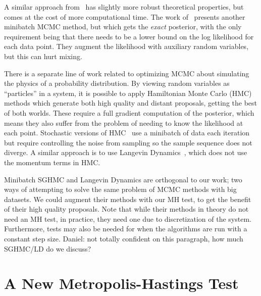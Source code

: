 \documentclass{article}
\begin{document}
A similar approach from~\cite{icml2014c1_bardenet14} has slightly more robust theoretical
properties, but comes at the cost of more computational time. The work
of~\cite{conf/uai/MaclaurinA14} presents another minibatch MCMC method, but which gets the
\emph{exact} posterior, with the only requirement being that there needs to be a lower bound on the
log likelihood for each data point. They augment the likelihood with auxiliary random variables, but
this can hurt mixing.

There is a separate line of work related to optimizing MCMC about simulating the physics of a
probability distribution. By viewing random variables as ``particles'' in a system, it is possible
to apply Hamiltonian Monte Carlo (HMC)~\cite{mcmc_hamiltonian_2010} methods which generate both high
quality and distant proposals, getting the best of both worlds. These require a full gradient
computation of the posterior, which means they also suffer from the problem of needing to know the
likelihood at each point. Stochastic versions of HMC~\cite{sghmc_2014,stochastic_thermostats_2014}
use a minibatch of data each iteration but require controlling the noise from sampling so the sample
sequence does not diverge. A similar approach is to use Langevin
Dynamics~\cite{langevin_2011,conf/icml/AhnBW12}, which does not use the momentum terms in HMC.

Minibatch SGHMC and Langevin Dynamics are orthogonal to our work; two ways of attempting
to solve the same problem of MCMC methods with big datasets. We could augment their methods with our
MH test, to get the benefit of their high quality proposals. Note that while their methods in theory
do not need an MH test, in practice, they need one due to discretization of the system. Furthermore,
tests may also be needed for when the algorithms are run with a constant step size. {\color{blue}
Daniel: not totally confident on this paragraph, how much SGHMC/LD do we discuss?}





\section{A New Metropolis-Hastings Test}\label{sec:our_algorithm}
\end{document}
